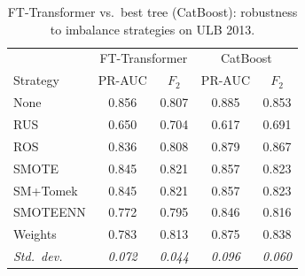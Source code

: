 \begin{table}[ht!]
\centering
\caption{FT-Transformer vs.\ best tree (CatBoost): robustness to imbalance strategies on ULB 2013.}
\label{tab:transformer_robustness_ulb}
\begin{tabular}{l cc cc}
\toprule
& \multicolumn{2}{c}{FT-Transformer} & \multicolumn{2}{c}{CatBoost} \\
Strategy & PR-AUC & $F_2$ & PR-AUC & $F_2$ \\
\midrule
None      & 0.856 & 0.807 & 0.885 & 0.853 \\
RUS       & 0.650 & 0.704 & 0.617 & 0.691 \\
ROS       & 0.836 & 0.808 & 0.879 & 0.867 \\
SMOTE     & 0.845 & 0.821 & 0.857 & 0.823 \\
SM+Tomek  & 0.845 & 0.821 & 0.857 & 0.823 \\
SMOTEENN  & 0.772 & 0.795 & 0.846 & 0.816 \\
Weights   & 0.783 & 0.813 & 0.875 & 0.838 \\
\midrule
\textit{Std.\ dev.} & \textit{0.072} & \textit{0.044} & \textit{0.096} & \textit{0.060} \\
\bottomrule
\end{tabular}
\end{table}
